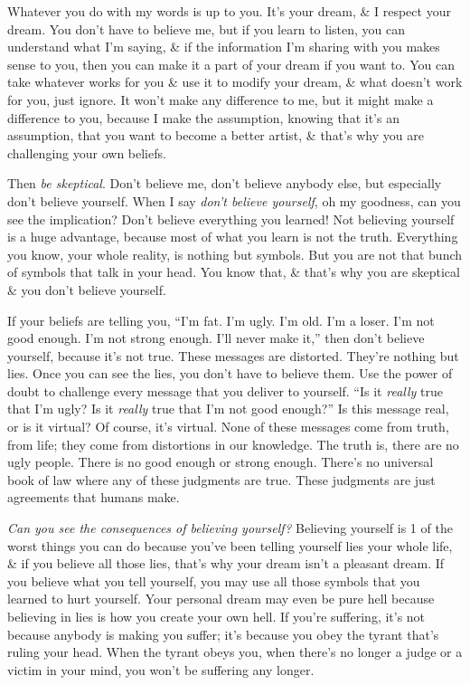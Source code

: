 \documentclass{article}
\numberwithin{equation}{section}
\begin{document}
Whatever you do with my words is up to you. It's your dream, \& I respect your dream. You don't have to believe me, but if you learn to listen, you can understand what I'm saying, \& if the information I'm sharing with you makes sense to you, then you can make it a part of your dream if you want to. You can take whatever works for you \& use it to modify your dream, \& what doesn't work for you, just ignore. It won't make any difference to me, but it might make a difference to you, because I make the assumption, knowing that it's an assumption, that you want to become a better artist, \& that's why you are challenging your own beliefs.

Then \textit{be skeptical}. Don't believe me, don't believe anybody else, but especially don't believe yourself. When I say \textit{don't believe yourself}, oh my goodness, can you see the implication? Don't believe everything you learned! Not believing yourself is a huge advantage, because most of what you learn is not the truth. Everything you know, your whole reality, is nothing but symbols. But you are not that bunch of symbols that talk in your head. You know that, \& that's why you are skeptical \& you don't believe yourself.

If your beliefs are telling you, ``I'm fat. I'm ugly. I'm old. I'm a loser. I'm not good enough. I'm not strong enough. I'll never make it,'' then don't believe yourself, because it's not true. These messages are distorted. They're nothing but lies. Once you can see the lies, you don't have to believe them. Use the power of doubt to challenge every message that you deliver to yourself. ``Is it \textit{really} true that I'm ugly? Is it \textit{really} true that I'm not good enough?'' Is this message real, or is it virtual? Of course, it's virtual. None of these messages come from truth, from life; they come from distortions in our knowledge. The truth is, there are no ugly people. There is no good enough or strong enough. There's no universal book of law where any of these judgments are true. These judgments are just agreements that humans make.

\textit{Can you see the consequences of believing yourself?} Believing yourself is 1 of the worst things you can do because you've been telling yourself lies your whole life, \& if you believe all those lies, that's why your dream isn't a pleasant dream. If you believe what you tell yourself, you may use all those symbols that you learned to hurt yourself. Your personal dream may even be pure hell because believing in lies is how you create your own hell. If you're suffering, it's not because anybody is making you suffer; it's because you obey the tyrant that's ruling your head. When the tyrant obeys you, when there's no longer a judge or a victim in your mind, you won't be suffering any longer.
\end{document}
